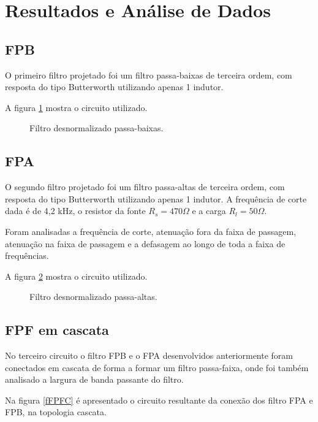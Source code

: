 
\newpage

\section{Resultados e Análise de Dados}

\subsection{FPB}
O primeiro filtro projetado foi um filtro passa-baixas de terceira ordem, com 
resposta do tipo Butterworth utilizando apenas 1 indutor.



A figura \ref{fFPB} mostra o circuito utilizado.\begin{figure}[H]
  \centering
  
  \label{fFPB}
  \caption{Filtro desnormalizado passa-baixas.}
\end{figure}



\subsection{FPA}
O segundo filtro projetado foi um filtro passa-altas de terceira ordem, com 
resposta do tipo Butterworth utilizando apenas 1 indutor. A frequência de corte 
dada é de 4,2 kHz, o resistor da fonte $R_s = 470 \Omega$ e a carga $R_l = 50 
\Omega$.

Foram analisadas a frequência de corte, atenuação fora da faixa de passagem, 
atenuação na faixa de passagem e a defasagem ao longo de toda a faixa de 
frequências.

A figura \ref{fFPA} mostra o circuito utilizado.\begin{figure}[H]
  \centering
  \label{fFPA}
  \caption{Filtro desnormalizado passa-altas.}
\end{figure}

\subsection{FPF em cascata}
No terceiro circuito o filtro FPB e o FPA desenvolvidos anteriormente foram 
conectados em cascata de forma a formar um filtro passa-faixa, onde foi também 
analisado a largura de banda passante do filtro.

Na figura \ref{fFPFC} é apresentado o circuito resultante da conexão dos filtro 
FPA e FPB, na topologia cascata.


